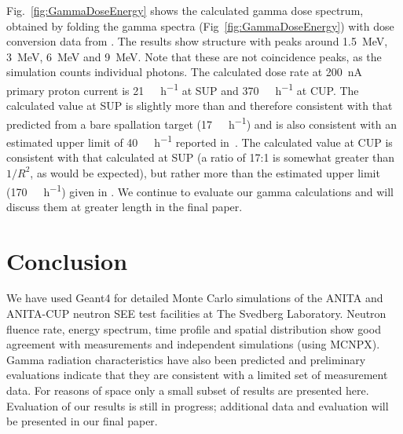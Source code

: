 \documentclass[peerreviewca,11pt,a4paper]{IEEEtran}
\begin{document}
Fig.~\ref{fig:GammaDoseEnergy} shows the calculated gamma dose spectrum, obtained by folding the gamma spectra (Fig~\ref{fig:GammaDoseEnergy}) with dose conversion data from \cite{Kwon1980}.
The results show structure with peaks around \SI{1.5}{\MeV}, \SI{3}{\MeV}, \SI{6}{\MeV} and \SI{9}{\MeV}.
Note that these are not coincidence peaks, as the simulation counts individual photons.
The calculated dose rate at \SI{200}{\nA} primary proton current is \SI{21}{\milli\seivert\per\hour} at SUP and \SI{370}{\milli\seivert\per\hour} at CUP.
The calculated value at SUP is slightly more than and therefore consistent with that predicted from a bare spallation target (\SI{17}{\milli\seivert\per\hour}) and is also consistent with an estimated upper limit of \SI{40}{\milli\seivert\per\hour} reported in~\cite{Prokofiev2009}.
The calculated value at CUP is consistent with that calculated at SUP (a ratio of 17:1 is somewhat greater than $1/R^2$, as would be expected), but rather more than the estimated upper limit (\SI{170}{\milli\seivert\per\hour}) given in \cite{Prokofiev2014}.
We continue to evaluate our gamma calculations and will discuss them at greater length in the final paper.

\section{Conclusion}
We have used Geant4 for detailed Monte Carlo simulations of the ANITA and ANITA-CUP neutron SEE test facilities at The Svedberg Laboratory.
Neutron fluence rate, energy spectrum, time profile and spatial distribution show good agreement with measurements and independent simulations (using MCNPX).
Gamma radiation characteristics have also been predicted and preliminary evaluations indicate that they are consistent with a limited set of measurement data.
For reasons of space only a small subset of results are presented here.
Evaluation of our results is still in progress; additional data and evaluation will be presented in our final paper.
\end{document}
